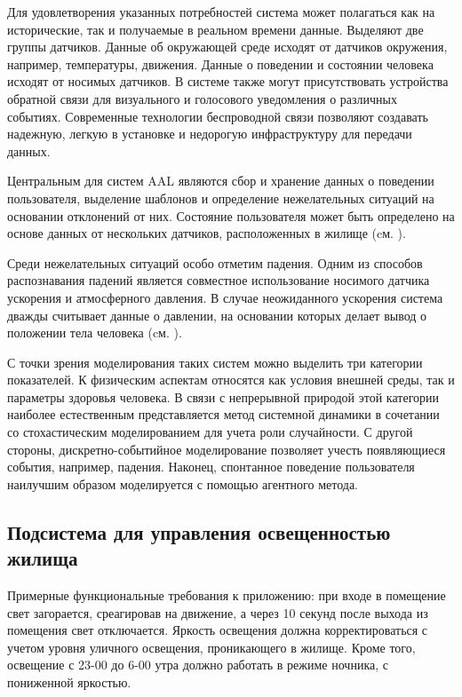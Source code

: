 Для удовлетворения указанных потребностей система может полагаться как на исторические, так и получаемые в реальном времени данные. Выделяют две группы датчиков. Данные об окружающей среде исходят от датчиков окружения, например, температуры, движения. Данные о поведении и состоянии человека исходят от носимых датчиков. В системе также могут присутствовать устройства обратной связи для визуального и голосового уведомления о различных событиях. Современные технологии беспроводной связи позволяют создавать надежную, легкую в установке и недорогую инфраструктуру для передачи данных.

Центральным для систем AAL являются сбор и хранение данных о поведении пользователя, выделение шаблонов и определение нежелательных ситуаций на основании отклонений от них. Состояние пользователя может быть определено на основе данных от нескольких датчиков, расположенных в жилище (cм. ).

Среди нежелательных ситуаций особо отметим падения. Одним из способов распознавания падений является совместное использование носимого датчика ускорения и атмосферного давления. В случае неожиданного ускорения система дважды считывает данные о давлении, на основании которых делает вывод о положении тела человека (cм. ).

С точки зрения моделирования таких систем можно выделить три категории показателей. К физическим аспектам относятся как условия внешней среды, так и параметры здоровья человека. В связи с непрерывной природой этой категории наиболее естественным представляется метод системной динамики в сочетании со стохастическим моделированием для учета роли случайности. С другой стороны, дискретно-событийное моделирование позволяет учесть появляющиеся события, например, падения. Наконец, спонтанное поведение пользователя наилучшим образом моделируется с помощью агентного метода.

\subsection{Подсистема для управления освещенностью жилища}
Примерные функциональные требования к приложению: при входе в помещение свет загорается, среагировав на движение, а через 10 секунд после выхода из помещения свет отключается. Яркость освещения должна корректироваться с учетом уровня уличного освещения, проникающего в жилище. Кроме того, освещение с 23-00 до 6-00 утра должно работать в режиме ночника, с пониженной яркостью.

